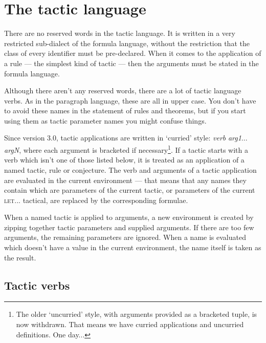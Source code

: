 \chapter{The tactic language}
\label{appx:tacticlang}


There are no reserved words in the tactic language. It is written in a very restricted sub-dialect of the formula language, without the restriction that the class of every identifier must be pre-declared. When it comes to the application of a rule --- the simplest kind of tactic --- then the arguments must be stated in the formula language.


Although there aren't any reserved words, there are a lot of tactic language verbs. As in the paragraph language, these are all in upper case. You don't have to avoid these names in the statement of rules and theorems, but if you start using them as tactic parameter names you might confuse things.


Since version 3.0, tactic applications are written in `curried' style: \textit{verb} \textit{arg1}... \textit{argN}, where each argument is bracketed if necessary\footnote{The older `uncurried' style, with arguments provided as a bracketed tuple, is now withdrawn. That means we have curried applications and uncurried definitions. One day...}. If a tactic starts with a verb which isn't one of those listed below, it is treated as an application of a named tactic, rule or conjecture. The verb and arguments of a tactic application are evaluated in the current environment --- that means that any names they contain which are parameters of the current tactic, or parameters of the current \textsc{let...} tactical, are replaced by the corresponding formulae.


When a named tactic is applied to arguments, a new environment is created by zipping together tactic parameters and supplied arguments. If there are too few arguments, the remaining parameters are ignored. When a name is evaluated which doesn't have a value in the current environment, the name itself is taken as the result.


\section{Tactic verbs}


